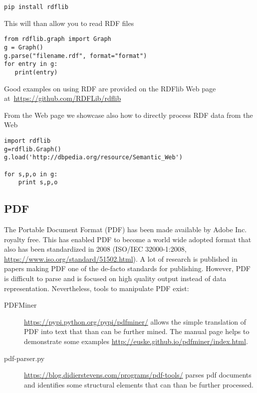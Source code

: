 \begin{verbatim}
pip install rdflib
\end{verbatim}

This will than allow you to read RDF files

\begin{verbatim}
from rdflib.graph import Graph
g = Graph()
g.parse("filename.rdf", format="format")
for entry in g:
   print(entry)
\end{verbatim}

Good examples on using RDF are provided on the RDFlib Web page
at~\url{https://github.com/RDFLib/rdflib}

From the Web page we showcase also how to directly process RDF data
from the Web

\begin{verbatim}
import rdflib
g=rdflib.Graph()
g.load('http://dbpedia.org/resource/Semantic_Web')

for s,p,o in g:
    print s,p,o
\end{verbatim}

\subsection{PDF}

The Portable Document Format (PDF) has been made available by Adobe
Inc. royalty free. This has enabled PDF to become a world wide adopted
format that also has been standardized in 2008 (ISO/IEC 32000-1:2008,
\url{https://www.iso.org/standard/51502.html}).  A lot of research is
published in papers making PDF one of the de-facto standards for
publishing. However, PDF is difficult to parse and is focused on high
quality output instead of data representation. Nevertheless,
tools to manipulate PDF exist:

\begin{description}
\item[PDFMiner] \url{https://pypi.python.org/pypi/pdfminer/} allows
  the simple translation of PDF into text that than can be further
  mined. The manual page helps to demonstrate some examples
  \url{http://euske.github.io/pdfminer/index.html}.

\item[pdf-parser.py]
  \url{https://blog.didierstevens.com/programs/pdf-tools/} parses pdf
  documents and identifies some structural elements that can than be
  further processed.

\end{description}

